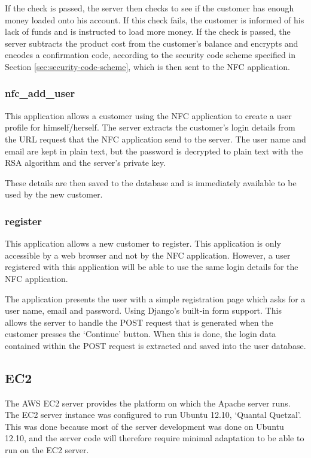 If the check is passed, the server then checks to see if the customer has enough money loaded
onto his account. If this check fails, the customer is informed of his lack of funds
and is instructed to load more money. If the check is passed, the server subtracts the product
cost from the customer's balance and encrypts and encodes a confirmation code, according to the
security code scheme specified in Section \ref{sec:security-code-scheme}, which is then sent
to the NFC application. 

\subsubsection{nfc\_add\_user}

This application allows a customer using the NFC application to create a user profile for himself/herself. The
server extracts the customer's login details from the URL request that the NFC application send to the
server. The user name and email are kept in plain text, but the password is decrypted to
plain text with the RSA algorithm and the server's private key.

These details are then saved to the database and is immediately available to be used by the new
customer. 

\subsubsection{register}

This application allows a new customer to register. This application is only accessible by a web browser and
not by the NFC application. However, a user registered with this application will be able to use the same login
details for the NFC application.

The application presents the user with a simple registration page which asks for a user name, email and
password. Using Django's built-in form support. This allows the server to handle the
POST request that is generated when the customer presses the `Continue' button. When this is
done, the login data contained within the POST request is extracted and saved into the user
database. 

\subsection{EC2}

The AWS EC2 server provides the platform on which the Apache
server runs. The EC2 server instance was configured to run
Ubuntu 12.10, `Quantal Quetzal'. This was done because most
of the server development was done on Ubuntu 12.10, and the
server code will therefore require minimal adaptation to be able to run on the EC2 server.

